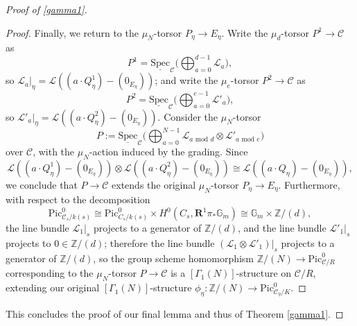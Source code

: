 \documentclass[11pt]{amsart}
\theoremstyle{definition}
\begin{document}
\begin{proof}[Proof of \ref{gamma1}]
\begin{proof}
Finally, we return to the $\mu_N$-torsor $P_\eta \rightarrow E_\eta$. Write the $\mu_d$-torsor $P^1 \rightarrow {\mathcal{C}}$ as 
\begin{displaymath}
P^1 = \underline{\mathrm{Spec}}_{\mathcal{C}} \big( \bigoplus_{a = 0}^{d-1} {\mathcal{L}}_a \big),
\end{displaymath}
so ${\mathcal{L}}_a|_\eta = {\mathcal{L}}((a\cdot Q^1_\eta)-(0_{E_\eta}))$; and write the $\mu_e$-torsor $P^2 \rightarrow {\mathcal{C}}$ as 
\begin{displaymath}
P^2 = \underline{\mathrm{Spec}}_{\mathcal{C}} \big( \bigoplus_{a = 0}^{e-1} {\mathcal{L}}'_a \big),
\end{displaymath}
so ${\mathcal{L}}'_a|_\eta = {\mathcal{L}}((a\cdot Q^2_\eta)-(0_{E_\eta}))$. Consider the $\mu_N$-torsor 
\begin{displaymath}
P := \underline{\mathrm{Spec}}_{\mathcal{C}} \big( \bigoplus_{a = 0}^{N-1} {\mathcal{L}}_{\textrm{$a$ mod $d$}} \otimes {\mathcal{L}}'_{\textrm{$a$ mod $e$}} \big)
\end{displaymath}
over ${\mathcal{C}}$, with the $\mu_N$-action induced by the grading. Since 
\begin{displaymath}
{\mathcal{L}}((a\cdot Q^1_\eta)-(0_{E_\eta}))\otimes {\mathcal{L}}((a\cdot Q^2_\eta)-(0_{E_\eta})) \cong {\mathcal{L}}((a\cdot Q_\eta)-(0_{E_\eta})),
\end{displaymath}
we conclude that $P \rightarrow {\mathcal{C}}$ extends the original $\mu_N$-torsor $P_\eta \rightarrow E_\eta$. Furthermore, with respect to the decomposition 
\begin{displaymath}
\mathrm{Pic}^0_{{\mathcal{C}}_s/k(s)} \cong \mathrm{Pic}^0_{C_s/k(s)} \times H^0 (C_s, \mathbf{R}^1\pi_* \mathbb{G}_m) \cong \mathbb{G}_m \times \mathbb{Z}/(d),
\end{displaymath}
the line bundle ${\mathcal{L}}_1|_s$ projects to a generator of $\mathbb{Z}/(d)$, and the line bundle ${\mathcal{L}}'_1|_s$ projects to $0 \in \mathbb{Z}/(d)$; therefore the line bundle $({\mathcal{L}}_1 \otimes {\mathcal{L}}'_1)|_s$ projects to a generator of $\mathbb{Z}/(d)$, so the group scheme homomorphism $\mathbb{Z}/(N) \rightarrow \mathrm{Pic}^0_{{\mathcal{C}}/R}$ corresponding to the $\mu_N$-torsor $P \rightarrow {\mathcal{C}}$ is a $[\Gamma_1(N)]$-structure on ${\mathcal{C}}/R$, extending our original $[\Gamma_1(N)]$-structure $\phi_\eta: \mathbb{Z}/(N) \rightarrow \mathrm{Pic}^0_{{\mathcal{C}}_\eta/K}$.
\end{proof}

This concludes the proof of our final lemma and thus of Theorem \ref{gamma1}.
\end{proof}
\end{document}
